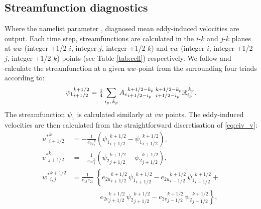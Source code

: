 \documentclass[../tex_main/NEMO_manual]{subfiles}
\begin{document}
\subsection{Streamfunction diagnostics}\label{sec:sfdiag}
Where the namelist parameter , diagnosed
mean eddy-induced velocities are output. Each time step,
streamfunctions are calculated in the $i$-$k$ and $j$-$k$ planes at
$uw$ (integer +1/2 $i$, integer $j$, integer +1/2 $k$) and $vw$
(integer $i$, integer +1/2 $j$, integer +1/2 $k$) points (see Table
\autoref{tab:cell}) respectively. We follow \citep{Griffies_Bk04} and
calculate the streamfunction at a given $uw$-point from the
surrounding four triads according to:
\begin{equation}
  \label{eq:sfdiagi}
  {\psi_1}_{i+1/2}^{k+1/2}={\textstyle\frac{1}{4}}\sum_{\substack{i_p,\,k_p}}
  {A_e}_{i+1/2-i_p}^{k+1/2-k_p}\:{}_{i+1/2-i_p}^{k+1/2-k_p}{\mathbb{R}}_{i_p}^{\,k_p}.
\end{equation}
The streamfunction $\psi_1$ is calculated similarly at $vw$ points.
The eddy-induced velocities are then calculated from the
straightforward discretisation of \autoref{eq:eiv_v}:
\begin{equation}\label{eq:eiv_v_discrete}
\begin{split}
 {u^*}_{i+1/2}^{k} & = - \frac{1}{{e_{3u}}_{i}^{k}}\left({\psi_1}_{i+1/2}^{k+1/2}-{\psi_1}_{i+1/2}^{k+1/2}\right),   \\
 {v^*}_{j+1/2}^{k} & = - \frac{1}{{e_{3v}}_{j}^{k}}\left({\psi_2}_{j+1/2}^{k+1/2}-{\psi_2}_{j+1/2}^{k+1/2}\right),   \\
 {w^*}_{i,j}^{k+1/2} & =    \frac{1}{e_{1t}e_{2t}}\; \left\{
 {e_{2u}}_{i+1/2}^{k+1/2} \,{\psi_1}_{i+1/2}^{k+1/2} -
 {e_{2u}}_{i-1/2}^{k+1/2} \,{\psi_1}_{i-1/2}^{k+1/2} \right. + \\
\phantom{=} & \qquad\qquad\left. {e_{2v}}_{j+1/2}^{k+1/2} \,{\psi_2}_{j+1/2}^{k+1/2} - {e_{2v}}_{j-1/2}^{k+1/2} \,{\psi_2}_{j-1/2}^{k+1/2} \right\},
\end{split}
\end{equation}
\end{document}
